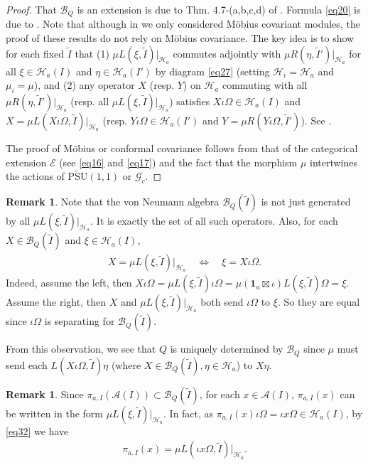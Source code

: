 \documentclass[11pt,b5paper,notitlepage]{article}
\theoremstyle{definition}
\newtheorem{rem}[df]{Remark}
\theoremstyle{plain}
\newcommand{\mc}{\mathcal}
\newcommand{\wtd}{\widetilde}
\newcommand{\id}{\mathbf{1}}
\newcommand{\scr}{\mathscr}
\newcommand{\UPSU}{\widetilde{\mathrm{PSU}}(1,1)}
\newcommand{\Gc}{\mathscr G_c}
\numberwithin{equation}{section}
\begin{document}
\begin{proof}
That $\mc B_Q$ is an extension is due to Thm. 4.7-(a,b,c,d) of \cite{Gui21b}. Formula \eqref{eq20} is due to \cite[Prop. 4.5]{Gui21b}. Note that although in \cite{Gui21b} we only considered M\"obius covariant modules, the proof of these results do not rely on M\"obius covariance. The key idea is to show for each fixed $\wtd I$ that  (1) $\mu L(\xi,\wtd I)|_{\mc H_a}$ commutes adjointly with $\mu R(\eta,\wtd I')|_{\mc H_a}$ for all $\xi\in\mc H_a(I)$ and $\eta\in\mc H_a(I')$ by diagram \eqref{eq27} (setting $\mc H_i=\mc H_a$ and $\mu_i=\mu$), and (2) any operator $X$ (resp. $Y$) on $\mc H_a$ commuting with all $\mu R(\eta,\wtd I')|_{\mc H_a}$ (resp. all $\mu L(\xi,\wtd I)|_{\mc H_a}$) satisfies $X\iota\Omega\in\mc H_a(I)$ and $X=\mu L(X\iota\Omega,\wtd I)|_{\mc H_a}$ (resp. $Y\iota\Omega\in\mc H_a(I')$ and $Y=\mu R(Y\iota\Omega,\wtd I')$). See \cite[Prop. 4.3, 4.5]{Gui21b}.

The proof of M\"obius or conformal covariance follows from that of the categorical extension $\scr E$ (see \eqref{eq16} and \eqref{eq17}) and the fact that the morphism $\mu$ intertwines the actions of $\UPSU$ or $\Gc$. 
\end{proof}

\begin{rem}\label{lb27}
Note that the von Neumann algebra $\mc B_Q(\wtd I)$ is not just generated by all $\mu L(\xi,\wtd I)|_{\mc H_a}$. It is exactly the set of all such operators. Also, for each $X\in\mc B_Q(\wtd I)$ and $\xi\in\mc H_a(I)$, 
\begin{align}
X=\mu L(\xi,\wtd I)|_{\mc H_a}\quad\Leftrightarrow\quad\xi= X\iota\Omega.\label{eq32}	
\end{align}
Indeed, assume the left, then $X\iota\Omega=\mu L(\xi,\wtd I)\iota\Omega=\mu(\id_a\boxtimes\iota)L(\xi,\wtd I)\Omega=\xi$. Assume the right, then $X$ and $\mu L(\xi,\wtd I)|_{\mc H_a}$ both send $\iota\Omega$ to $\xi$. So they are equal since $\iota\Omega$ is separating for $\mc B_Q(\wtd I)$.

From this observation, we see that $Q$ is uniquely determined by $\mc B_Q$ since $\mu$ must send each $L(X\iota\Omega,\wtd I)\eta$ (where $X\in\mc B_Q(\wtd I),\eta\in\mc H_a$) to $X\eta$.
\end{rem}



\begin{rem}
Since $\pi_{a,I}(\mc A(I))\subset\mc B_Q(\wtd I)$, for each $x\in\mc A(I)$, $\pi_{a,I}(x)$ can be written in the form $\mu L(\xi,\wtd I)|_{\mc H_a}$. In fact, as $\pi_{a,I}(x)\iota\Omega=\iota x\Omega\in\mc H_a(I)$, by \eqref{eq32} we have
\begin{align}
	\pi_{a,I}(x)=\mu L(\iota x\Omega,\wtd I)|_{\mc H_a}.\label{eq7}	
\end{align}
\end{rem}
\end{document}
